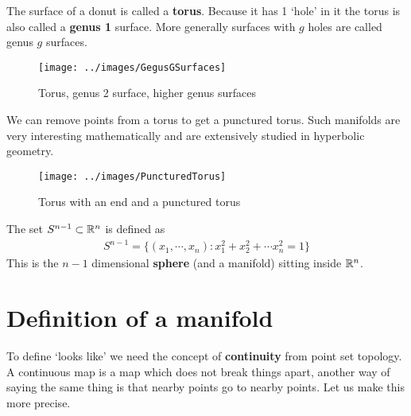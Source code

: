 	\begin{example}[Surfaces]
		The surface of a donut is called a \textbf{torus}. Because it has 1 `hole' in it the torus is also called a \textbf{genus 1} surface. More generally surfaces with $g$ holes are called genus $g$ surfaces.
		\begin{figure}[H]
			\centering \texttt{[image: ../images/GegusGSurfaces]}
			\caption{Torus, genus 2 surface, higher genus surfaces}
		\end{figure}
		We can remove points from a torus to get a punctured torus. Such manifolds are very interesting mathematically and are extensively studied in hyperbolic geometry.
		\begin{figure}[H]
			\centering \texttt{[image: ../images/PuncturedTorus]}
			\caption{Torus with an end and a punctured torus}
		\end{figure}
	\end{example}

	\begin{example}[Spheres]
		The set $S^{n-1} \subset \mathbb{R}^n$ is defined as
		\begin{align*}
			S^{n-1} = \{ (x_1, \cdots, x_n) : x_1^2 + x_2 ^{2} + \cdots x_n ^{2} = 1 \}
		\end{align*}
		This is the $n-1$ dimensional \textbf{sphere} (and a manifold) sitting inside $\mathbb{R}^n$.
	\end{example}











	\section{Definition of a manifold}
	To define `looks like' we need the concept of \textbf{continuity} from point set topology. A continuous map is a map which does not break things apart, another way of saying the same thing is that nearby points go to nearby points. Let us make this more precise.

